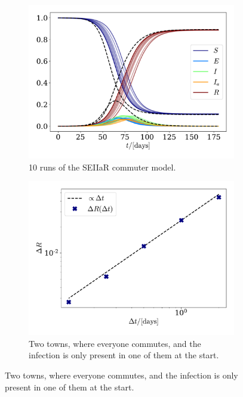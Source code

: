 \documentclass{article}
\begin{document}
    \begin{figure}[H]
        \centering
        \begin{subfigure}{.49\textwidth}
            \includegraphics[width=\textwidth]{../plots/2D/TestSEIIaR_commute.pdf}
            \caption{10 runs of the SEIIaR commuter model.}
            \label{SEIIaR commute}
        \end{subfigure}
        \begin{subfigure}{.49\textwidth}
            \includegraphics[width=\textwidth]{../plots/2D/conv.pdf}
            \caption{Two towns, where everyone commutes, and the infection is only present in one of them at the start. }
            \label{SEIIaR commute conv}
        \end{subfigure}
    \end{figure}
\end{document}
